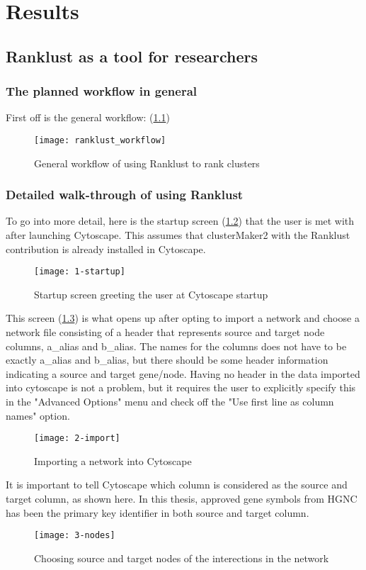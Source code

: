 \part{Results}
\label{pa:results}
\chapter{Ranklust as a tool for researchers}
\section{The planned workflow in general}
First off is the general workflow: (\ref{fig:ranklust-workflow})
\begin{figure}
    \texttt{[image: ranklust\_workflow]}
    \caption{General workflow of using Ranklust to rank clusters}
    \label{fig:ranklust-workflow}
\end{figure}

\section{Detailed walk-through of using Ranklust}
To go into more detail, here is the startup screen (\ref{fig:startup}) that the
user is met with after launching Cytoscape. This assumes that clusterMaker2 with
the Ranklust contribution is already installed in Cytoscape.
\begin{figure}[H]
    \texttt{[image: 1-startup]}
    \caption{Startup screen greeting the user at Cytoscape startup}
    \label{fig:startup}
\end{figure}

This screen (\ref{fig:import}) is what opens up after opting to import a network
and choose a network file consisting of a header that represents source and
target node columns, a\_alias and b\_alias. The names for the columns does not
have to be exactly a\_alias and b\_alias, but there should be some header
information indicating a source and target gene/node. Having no header in the
data imported into cytoscape is not a problem, but it requires the user to
explicitly specify this in the "Advanced Options" menu and check off the "Use
first line as column names" option.
\begin{figure}[H]
    \texttt{[image: 2-import]}
    \caption{Importing a network into Cytoscape}
    \label{fig:import}
\end{figure}

It is important to tell Cytoscape which column is considered as the source and
target column, as shown here. In this thesis, approved gene symbols from HGNC
has been the primary key identifier in both source and target column.
\begin{figure}[H]
    \texttt{[image: 3-nodes]}
    \caption{Choosing source and target nodes of the interections in the network}
    \label{fig:nodes}
\end{figure}


